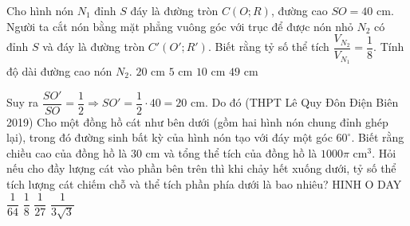 \begin{ex}
	Cho hình nón $N_1$ đỉnh $S$ đáy là đường tròn $C(O; R)$, đường cao $SO=40$ $\mathrm{cm}$. Người ta cắt nón bằng mặt phẳng vuông góc với trục để được nón nhỏ $N_2$ có đỉnh $S$ và đáy là đường tròn $C'(O'; R')$. Biết rằng tỷ số thể tích $\dfrac{V_{N_2}}{V_{N_1}}=\dfrac{1}{8}$. Tính độ dài đường cao nón $N_2$. 
	\choice
	{\True $20$ $\mathrm{cm}$}
	{$5$ $\mathrm{cm}$}
	{$10$ $\mathrm{cm}$}
	{$49$ $\mathrm{cm}$}
\end{ex}
\begin{ex}
	Suy ra $\dfrac{SO'}{SO}=\dfrac{1}{2}\Rightarrow SO'=\dfrac{1}{2}\cdot 40=20$ $\mathrm{cm}$. Do đó (THPT Lê Quy Đôn Điện Biên 2019) Cho một đồng hồ cát như bên dưới (gồm hai hình nón chung đỉnh ghép lại), trong đó đường sinh bất kỳ của hình nón tạo với đáy một góc $60^{\circ}$. Biết rằng chiều cao của đồng hồ là $30$ $\mathrm{cm}$ và tổng thể tích của đồng hồ là $1000\pi$ $\mathrm{cm}^3$. Hỏi nếu cho đầy lượng cát vào phần bên trên thì khi chảy hết xuống dưới, tỷ số thể tích lượng cát chiếm chỗ và thể tích phần phía dưới là bao nhiêu?
	{\color{red} HINH O DAY}
	\choice
	{$\dfrac{1}{64}$}
	{\True $\dfrac{1}{8}$}
	{$\dfrac{1}{27}$}
	{$\dfrac{1}{3\sqrt{3}}$}
\end{ex}
